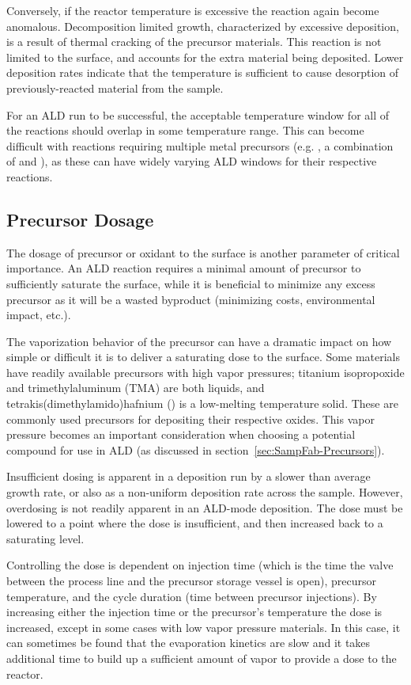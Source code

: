 Conversely, if the reactor temperature is excessive the reaction again become anomalous. Decomposition limited growth, characterized by excessive deposition, is a result of thermal cracking of the precursor materials. This reaction is not limited to the surface, and accounts for the extra material being deposited. Lower deposition rates indicate that the temperature is sufficient to cause desorption of previously-reacted material from the sample. 

For an ALD run to be successful, the acceptable temperature window for all of the reactions should overlap in some temperature range. This can become difficult with reactions requiring multiple metal precursors (e.g. \PTO, a combination of  and ), as these can have widely varying ALD windows for their respective reactions. 


\subsection{Precursor Dosage}

The dosage of precursor or oxidant to the surface is another parameter of critical importance. An ALD reaction requires a minimal amount of precursor to sufficiently saturate the surface, while it is beneficial to minimize any excess precursor as it will be a wasted byproduct (minimizing costs, environmental impact, etc.). 

The vaporization behavior of the precursor can have a dramatic impact on how simple or difficult it is to deliver a saturating dose to the surface. Some materials have readily available precursors with high vapor pressures; titanium isopropoxide and trimethylaluminum (TMA) are both liquids, and tetrakis(dimethylamido)hafnium () is a low-melting temperature solid. These are commonly used precursors for depositing their respective oxides. This vapor pressure becomes an important consideration when choosing a potential compound for use in ALD (as discussed in section~\vref{sec:SampFab-Precursors}).

Insufficient dosing is apparent in a deposition run by a slower than average growth rate, or also as a non-uniform deposition rate across the sample. However, overdosing is not readily apparent in an ALD-mode deposition. The dose must be lowered to a point where the dose is insufficient, and then increased back to a saturating level. 

Controlling the dose is dependent on injection time (which is the time the valve between the process line and the precursor storage vessel is open), precursor temperature, and the cycle duration (time between precursor injections). By increasing either the injection time or the precursor's temperature the dose is increased, except in some cases with low vapor pressure materials. In this case, it can sometimes be found that the evaporation kinetics are slow and it takes additional time to build up a sufficient amount of vapor to provide a dose to the reactor. 

